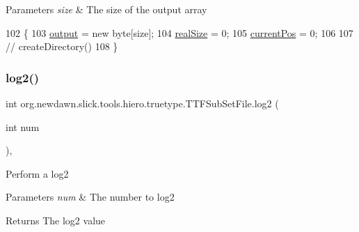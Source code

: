 \begin{DoxyParams}{Parameters}
{\em size} & The size of the output array \\
\hline
\end{DoxyParams}

\begin{DoxyCode}
102                                 \{
103         \mbox{\hyperlink{classorg_1_1newdawn_1_1slick_1_1tools_1_1hiero_1_1truetype_1_1_t_t_f_sub_set_file_a967f26c7cbd2c428f7ca96c4958edded}{output}} = \textcolor{keyword}{new} byte[size];
104         \mbox{\hyperlink{classorg_1_1newdawn_1_1slick_1_1tools_1_1hiero_1_1truetype_1_1_t_t_f_sub_set_file_afbd6781b24988e94a488596aa954ee3c}{realSize}} = 0;
105         \mbox{\hyperlink{classorg_1_1newdawn_1_1slick_1_1tools_1_1hiero_1_1truetype_1_1_t_t_f_sub_set_file_a5027011db0d9c307afa8de09102eaa10}{currentPos}} = 0;
106 
107         \textcolor{comment}{// createDirectory()}
108     \}
\end{DoxyCode}
\mbox{\label{classorg_1_1newdawn_1_1slick_1_1tools_1_1hiero_1_1truetype_1_1_t_t_f_sub_set_file_a121fd511ed2d80cd0653c0598c055538}} 
\subsubsection{\texorpdfstring{log2()}{log2()}}
{\footnotesize\ttfamily int org.\+newdawn.\+slick.\+tools.\+hiero.\+truetype.\+T\+T\+F\+Sub\+Set\+File.\+log2 (\begin{DoxyParamCaption}\item[{int}]{num }\end{DoxyParamCaption})\hspace{0.3cm}{\ttfamily [inline]}, {\ttfamily [private]}}

Perform a log2


\begin{DoxyParams}{Parameters}
{\em num} & The number to log2 \\
\hline
\end{DoxyParams}
\begin{DoxyReturn}{Returns}
The log2 value 
\end{DoxyReturn}

